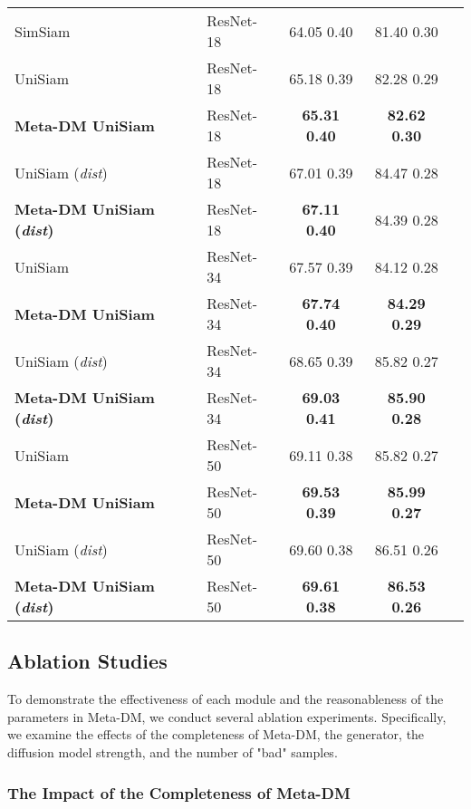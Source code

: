\documentclass{article}
\begin{document}
\begin{table}
\begin{tabular}{llccc}
		SimSiam \cite{i43} & ResNet-18 & 64.05  0.40  & 81.40  0.30  &  \\
		UniSiam \cite{i10} & ResNet-18 & 65.18  0.39  & 82.28  0.29  &  \\
		\textbf{Meta-DM  UniSiam} & ResNet-18 & \textbf{65.31  0.40}  &  \textbf{ 82.62  0.30 } &  \\
		UniSiam (\textit{dist}) & ResNet-18 & 67.01  0.39  & 84.47  0.28  &  \\
		\textbf{Meta-DM  UniSiam (\textit{dist})} & ResNet-18 & \textbf{67.11  0.40}  &  84.39  0.28 &  \\
		\cmidrule(r){1-4}
		UniSiam \cite{i10} & ResNet-34 & 67.57  0.39  & 84.12  0.28  &  \\			
		\textbf{Meta-DM  UniSiam} & ResNet-34 & \textbf{67.74  0.40}  &  \textbf{ 84.29  0.29 } &  \\
		UniSiam (\textit{dist})  & ResNet-34 & 68.65  0.39  & 85.82  0.27  &  \\		
		\textbf{Meta-DM  UniSiam (\textit{dist})} & ResNet-34 & \textbf{69.03  0.41}  &  \textbf{ 85.90  0.28 } &  \\
		\cmidrule(r){1-4}
		UniSiam \cite{i10} & ResNet-50 & 69.11  0.38  & 85.82  0.27  &  \\
		\textbf{Meta-DM  UniSiam} & ResNet-50 & \textbf{69.53  0.39}  &  \textbf{ 85.99  0.27 } &  \\
		UniSiam (\textit{dist})  & ResNet-50 & 69.60  0.38  & 86.51  0.26  &  \\		
		\textbf{Meta-DM  UniSiam (\textit{dist})} & ResNet-50 & \textbf{69.61  0.38}  &  \textbf{ 86.53  0.26 } &  \\
		\bottomrule
	\end{tabular}
	\label{table5}
\end{table}


\subsection{Ablation Studies}


To demonstrate the effectiveness of each module and the reasonableness of the parameters in Meta-DM, we conduct several ablation experiments. Specifically, we examine the effects of the completeness of Meta-DM, the generator, the diffusion model strength, and the number of "bad" samples.


\subsubsection{The Impact of the Completeness of Meta-DM}
\end{document}
